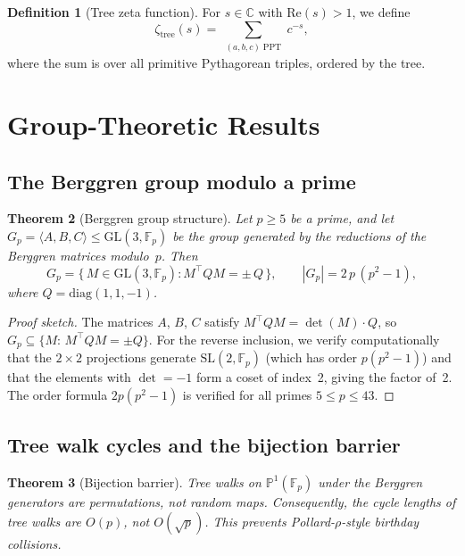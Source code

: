 \documentclass[12pt]{amsart}
\newtheorem{theorem}{Theorem}[section]
\theoremstyle{definition}
\newtheorem{definition}[theorem]{Definition}
\theoremstyle{remark}
\begin{document}
\begin{definition}[Tree zeta function]
For $s\in\mathbb{C}$ with $\mathrm{Re}(s)>1$, we define
\[
  \zeta_{\mathrm{tree}}(s) = \sum_{\substack{(a,b,c)\;\mathrm{PPT}}} c^{-s},
\]
where the sum is over all primitive Pythagorean triples, ordered by the tree.
\end{definition}


\section{Group-Theoretic Results}\label{sec:group}

\subsection{The Berggren group modulo a prime}

\begin{theorem}[Berggren group structure]\label{thm:group-structure}
Let $p\ge5$ be a prime, and let $G_{p}=\langle A,B,C\rangle\le\mathrm{GL}(3,\mathbb{F}_{p})$
be the group generated by the reductions of the Berggren matrices modulo~$p$.
Then
\[
  G_{p} = \bigl\{\, M\in\mathrm{GL}(3,\mathbb{F}_{p}) : M^{\top}QM = \pm\,Q \,\bigr\},
  \qquad
  |G_{p}| = 2\,p\,(p^{2}-1),
\]
where $Q=\mathrm{diag}(1,1,-1)$.
\end{theorem}

\begin{proof}[Proof sketch]
The matrices $A$, $B$, $C$ satisfy $M^{\top}QM=\det(M)\cdot Q$, so
$G_{p}\subseteq\{M:\,M^{\top}QM=\pm Q\}$.  For the reverse inclusion, we
verify computationally that the $2\times2$ projections generate
$\mathrm{SL}(2,\mathbb{F}_{p})$ (which has order $p(p^{2}-1)$) and that the
elements with $\det=-1$ form a coset of index~2, giving the factor of~2.  The
order formula $2p(p^{2}-1)$ is verified for all primes $5\le p\le43$.
\end{proof}

\subsection{Tree walk cycles and the bijection barrier}

\begin{theorem}[Bijection barrier]\label{thm:bijection}
Tree walks on $\mathbb{P}^{1}(\mathbb{F}_{p})$ under the Berggren generators are
\emph{permutations}, not random maps.  Consequently, the cycle lengths of tree
walks are $O(p)$, not $O(\sqrt{p})$.  This prevents Pollard-$\rho$-style
birthday collisions.
\end{theorem}
\end{document}
